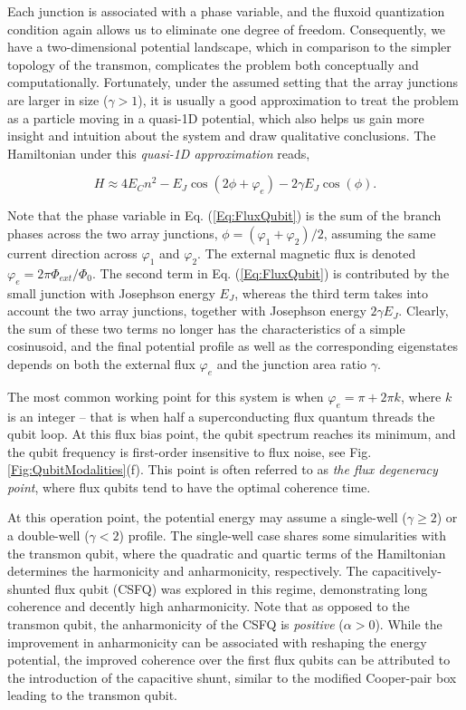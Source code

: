 \documentclass[aip,apr,twocolumn,showpacs,superscriptaddress,groupedaddress,nofootinbib,reprint]{revtex4-1}  %
\begin{document}
Each junction is associated with a phase variable, and the fluxoid quantization condition again allows us to eliminate one degree of freedom. Consequently, we have a two-dimensional potential landscape, which in comparison to the simpler topology of the transmon, complicates the problem both conceptually and computationally. Fortunately, under the assumed setting that the array junctions are larger in size ($\gamma > 1$), it is usually a good approximation to treat the problem as a particle moving in a quasi-1D potential, which also helps us gain more insight and intuition about the system and draw qualitative conclusions. The Hamiltonian under this \textit{quasi-1D approximation} reads,

\begin{equation}
H \approx 4E_Cn^2 - E_{J}\cos(2\phi + \varphi_e) - 2\gamma E_J\cos(\phi).
\label{Eq:FluxQubit}
\end{equation}

Note that the phase variable in Eq. (\ref{Eq:FluxQubit}) is the sum of the branch phases across the two array junctions, $\phi = (\varphi_1 + \varphi_2)/2$, assuming the same current direction across $\varphi_1$ and $\varphi_2$. The external magnetic flux is denoted $\varphi_e = 2 \pi  \Phi_{ext}/\Phi_0$. The second term in Eq. (\ref{Eq:FluxQubit}) is contributed by the small junction with Josephson energy $E_J$, whereas the third term takes into account the two array junctions, together with Josephson energy $2\gamma E_J$. Clearly, the sum of these two terms no longer has the characteristics of a simple cosinusoid, and the final potential profile as well as the corresponding eigenstates depends on both the external flux $\varphi_e$ and the junction area ratio $\gamma$.

The most common working point for this system is when $\varphi_e = \pi + 2\pi k$, where $k$ is an integer -- that is when half a superconducting flux quantum threads the qubit loop. At this flux bias point, the qubit spectrum reaches its minimum, and the qubit frequency is first-order insensitive to flux noise, see Fig. \ref{Fig:QubitModalities}(f). This point is often referred to as \textit{the flux degeneracy point}, where flux qubits tend to have the optimal coherence time.

At this operation point, the potential energy may assume a single-well ($\gamma \geq 2$) or a double-well ($\gamma < 2$) profile. The single-well case shares some simularities with the transmon qubit, where the quadratic and quartic terms of the Hamiltonian determines the harmonicity and anharmonicity, respectively. The capacitively-shunted flux qubit (CSFQ)\cite{You2006,Yan2016} was explored in this regime, demonstrating long coherence and decently high anharmonicity. Note that as opposed to the transmon qubit, the anharmonicity of the CSFQ is \textit{positive} ($\alpha > 0$). While the improvement in anharmonicity can be associated with reshaping the energy potential, the improved coherence over the first flux qubits can be attributed to the introduction of the capacitive shunt, similar to the modified Cooper-pair box leading to the transmon qubit.
\end{document}
